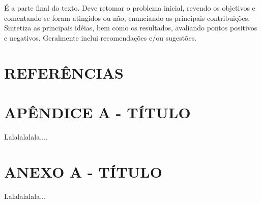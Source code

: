 \documentclass[
	12pt,				%
	oneside,			%
	a4paper,			%
	english,			%
	french,				%
	spanish,			%
	brazil,				%
	]{abntex2}
\theoremstyle{plain}
\theoremstyle{definition}
\begin{document}
É a parte final do texto. Deve retomar o problema inicial, revendo os objetivos
e comentando se foram atingidos ou não, enunciando as principais contribuições.
Sintetiza as principais idéias, bem como os resultados, avaliando pontos positivos e
negativos. Geralmente inclui recomendações e/ou sugestões. 

	\chapter*[Referências]{REFERÊNCIAS}




%







\chapter*[Apêndice]{APÊNDICE A - TÍTULO}

Lalalalalala....









\chapter*[Anexos]{ANEXO A - TÍTULO}

Lalalalalala...






\printindex
\end{document}
